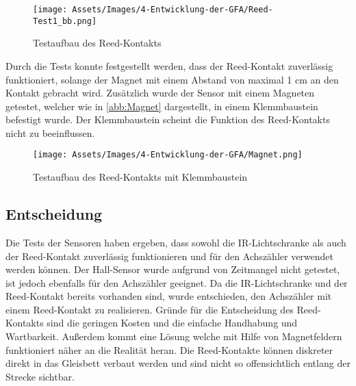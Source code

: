 \begin{figure}[H]
    \centering
    \texttt{[image: Assets/Images/4-Entwicklung-der-GFA/Reed-Test1\_bb.png]}
    \caption{Testaufbau des Reed-Kontakts}\label{abb:Reed-Kontakt}
\end{figure}

Durch die Tests konnte festgestellt werden, dass der Reed-Kontakt zuverlässig funktioniert, solange der Magnet mit einem Abstand von maximal 1 cm an den Kontakt gebracht wird. Zusätzlich wurde der Sensor mit einem Magneten getestet, welcher wie in \autoref{abb:Magnet} dargestellt, in einem Klemmbaustein befestigt wurde. Der Klemmbaustein scheint die Funktion des Reed-Kontakts nicht zu beeinflussen.

\begin{figure}[H]
    \centering
    \texttt{[image: Assets/Images/4-Entwicklung-der-GFA/Magnet.png]}
    \caption{Testaufbau des Reed-Kontakts mit Klemmbaustein}\label{abb:Magnet}
\end{figure}

\subsection{Entscheidung}\label{text:Entwicklung-der-GFA:Achszähler:Entscheidung}

Die Tests der Sensoren haben ergeben, dass sowohl die IR-Lichtschranke als auch der Reed-Kontakt zuverlässig funktionieren und für den Achszähler verwendet werden können. Der Hall-Sensor wurde aufgrund von Zeitmangel nicht getestet, ist jedoch ebenfalls für den Achszähler geeignet. Da die IR-Lichtschranke und der Reed-Kontakt bereits vorhanden sind, wurde entschieden, den Achszähler mit einem Reed-Kontakt zu realisieren.
\newline
Gründe für die Entscheidung des Reed-Kontakts sind die geringen Kosten und die einfache Handhabung und Wartbarkeit. Außerdem kommt eine Lösung welche mit Hilfe von Magnetfeldern funktioniert näher an die Realität heran. Die Reed-Kontakte können diskreter direkt in das Gleisbett verbaut werden und sind nicht so offensichtlich entlang der Strecke sichtbar.
